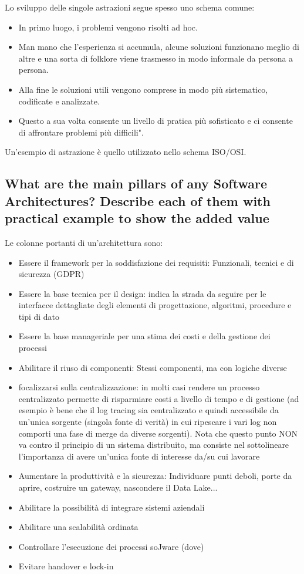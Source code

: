 \documentclass{article}
\begin{document}
Lo sviluppo delle singole astrazioni segue spesso uno schema comune:
\begin{itemize}
    \item In primo luogo, i problemi vengono risolti ad hoc.
    \item Man mano che l'esperienza si accumula, alcune soluzioni funzionano meglio di altre e una sorta di folklore viene trasmesso in modo informale da persona a persona.
    \item Alla fine le soluzioni utili vengono comprese in modo più sistematico, codificate e analizzate.
    \item Questo a sua volta consente un livello di pratica più sofisticato e ci consente di affrontare problemi più difficili".
\end{itemize}
Un'esempio di astrazione è quello utilizzato nello schema ISO/OSI.
\subsection{What are the main pillars of any Software Architectures? Describe each of them with practical example to show the added value}
Le colonne portanti di un’architettura sono:
\begin{itemize}
    \item Essere il framework per la soddisfazione dei requisiti: Funzionali, tecnici e di sicurezza (GDPR)
    \item Essere la base tecnica per il design: indica la strada da seguire per le interfacce dettagliate degli elementi di progettazione, algoritmi, procedure e tipi di dato
    \item Essere la base manageriale per una stima dei costi e della gestione dei processi
    \item Abilitare il riuso di componenti: Stessi componenti, ma con logiche diverse
    \item focalizzarsi sulla centralizzazione: in molti casi rendere un processo centralizzato permette di risparmiare costi a livello di tempo e di gestione (ad esempio è bene che il log tracing sia centralizzato e quindi accessibile da un'unica sorgente (singola fonte di verità) in cui ripescare i vari log non comporti una fase di merge da diverse sorgenti). Nota che questo punto NON va contro il principio di un sistema distribuito, ma consiste nel sottolineare l'importanza di avere un'unica fonte di interesse da/su cui lavorare
    \item Aumentare la produttività e la sicurezza: Individuare punti deboli, porte da aprire, costruire un gateway, nascondere il Data Lake...
    \item Abilitare la possibilità di integrare sistemi aziendali
    \item Abilitare una scalabilità ordinata
    \item Controllare l’esecuzione dei processi soJware (dove)
    \item Evitare handover e lock-in
\end{itemize}
\end{document}
